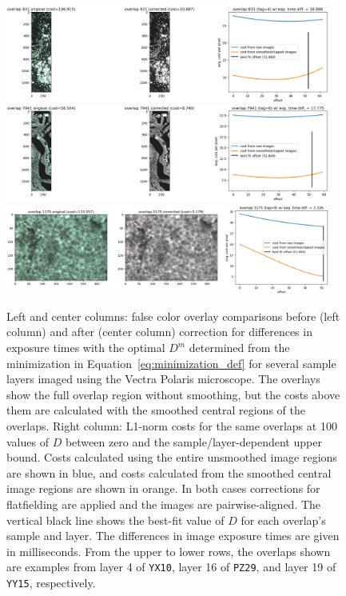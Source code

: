 \documentclass[letterpaper,11pt]{article}
\newcommand{\refeq}[1]{Equation~\ref{#1}}
\begin{document}
\begin{figure}[!ht]
\centering
\includegraphics[width=0.95\textwidth]{images/methods/cost_examples_polaris/overlay_comp_random_4357_offset=51.980}
\includegraphics[width=0.95\textwidth]{images/methods/cost_examples_polaris/overlay_comp_random_2668_offset=51.848}
\includegraphics[width=0.95\textwidth]{images/methods/cost_examples_polaris/overlay_comp_random_1554_offset=51.000}
\caption{\footnotesize Left and center columns: false color overlay comparisons before (left column) and after (center column) correction for differences in exposure times with the optimal $D^{m}$ determined from the minimization in \refeq{eq:minimization_def} for several sample layers imaged using the Vectra Polaris microscope. The overlays show the full overlap region without smoothing, but the costs above them are calculated with the smoothed central regions of the overlaps. Right column: L1-norm costs for the same overlaps at 100 values of $D$ between zero and the sample/layer-dependent upper bound. Costs calculated using the entire unsmoothed image regions are shown in blue, and costs calculated from the smoothed central image regions are shown in orange. In both cases corrections for flatfielding are applied and the images are pairwise-aligned. The vertical black line shows the best-fit value of $D$ for each overlap's sample and layer. The differences in image exposure times are given in milliseconds. From the upper to lower rows, the overlaps shown are examples from layer 4 of \texttt{YX10}, layer 16 of \texttt{PZ29}, and layer 19 of \texttt{YY15}, respectively.}
\label{fig:overlap_cost_examples_polaris_1}
\end{figure}
\end{document}
